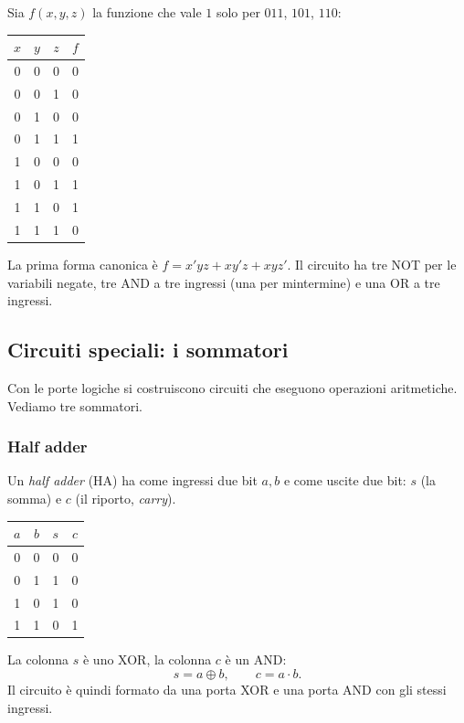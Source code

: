 \documentclass[11pt,a4paper]{article}
\begin{document}
\begin{esempio}
Sia $f(x,y,z)$ la funzione che vale $1$ solo per $011$, $101$, $110$:
\begin{center}
\begin{tabular}{ccc|c}
\toprule
$x$ & $y$ & $z$ & $f$ \\
\midrule
0 & 0 & 0 & 0 \\
0 & 0 & 1 & 0 \\
0 & 1 & 0 & 0 \\
0 & 1 & 1 & 1 \\
1 & 0 & 0 & 0 \\
1 & 0 & 1 & 1 \\
1 & 1 & 0 & 1 \\
1 & 1 & 1 & 0 \\
\bottomrule
\end{tabular}
\end{center}
La prima forma canonica è $f = x'yz + xy'z + xyz'$. Il circuito ha tre NOT per le variabili negate, tre AND a tre ingressi (una per mintermine) e una OR a tre ingressi.
\end{esempio}

\subsection{Circuiti speciali: i sommatori}

Con le porte logiche si costruiscono circuiti che eseguono operazioni aritmetiche. Vediamo tre sommatori.

\subsubsection{Half adder}

Un \emph{half adder} (HA) ha come ingressi due bit $a, b$ e come uscite due bit: $s$ (la somma) e $c$ (il riporto, \emph{carry}).
\begin{center}
\begin{tabular}{cc|cc}
\toprule
$a$ & $b$ & $s$ & $c$ \\
\midrule
0 & 0 & 0 & 0 \\
0 & 1 & 1 & 0 \\
1 & 0 & 1 & 0 \\
1 & 1 & 0 & 1 \\
\bottomrule
\end{tabular}
\end{center}
La colonna $s$ è uno XOR, la colonna $c$ è un AND:
\[
s = a \oplus b, \qquad c = a \cdot b.
\]
Il circuito è quindi formato da una porta XOR e una porta AND con gli stessi ingressi.
\end{document}
